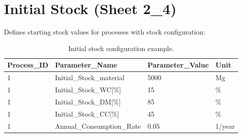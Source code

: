 \section{Initial Stock (Sheet 2\_4)}

Defines starting stock values for processes with stock configuration:

\begin{table}[h]
\centering
\begin{tabular}{llll}
\toprule
\textbf{Process\_ID} & \textbf{Parameter\_Name} & \textbf{Parameter\_Value} & \textbf{Unit} \\
\midrule
1 & Initial\_Stock\_material & 5000 & Mg \\
1 & Initial\_Stock\_WC{[}\%{]} & 15 & \% \\
1 & Initial\_Stock\_DM{[}\%{]} & 85 & \% \\
1 & Initial\_Stock\_CC{[}\%{]} & 45 & \% \\
1 & Annual\_Consumption\_Rate & 0.05 & 1/year \\
\bottomrule
\end{tabular}
\caption{Initial stock configuration example.}
\end{table}
